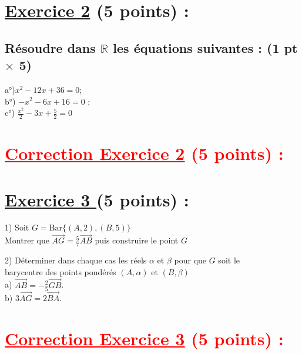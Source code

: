 \documentclass[12pt]{article}
\begin{document}
\section*{\underline{Exercice 2} (5 points) :}
\subsection*{ Résoudre dans $\mathbb{R}$ les équations suivantes : (1 pt $\times$ 5)}
a°)$x^{2}-12x+36=0$;\\ 
b°) $-x^{2}-6x+16=0$ ;\\
c°) $\frac{x^{2}}{2}-3x+\frac{5}{2}=0$\\
\section*{\textcolor{red}{\underline{Correction Exercice 2} (5 points) :}}
\section*{\underline{Exercice 3 }(5 points) :}
1) Soit $G=\mathrm{Bar}\lbrace (A,2),(B,5)\rbrace$\\
Montrer que $\overrightarrow{AG}=\frac{5}{7}\overrightarrow{AB}$ puis construire le point $G$

2) Déterminer dans chaque cas les réels $\alpha$ et $\beta$ pour que $G$ soit le \\barycentre des points pondérés $(A,\alpha)$ et $(B,\beta)$\\
a) $\overrightarrow{AB}=-\frac{2}{5}\overrightarrow{GB}$.\\
b) $3\overrightarrow{AG}=2\overrightarrow{BA}$.\\
\section*{\textcolor{red}{\underline{Correction Exercice 3} (5 points) :}}
\end{document}
